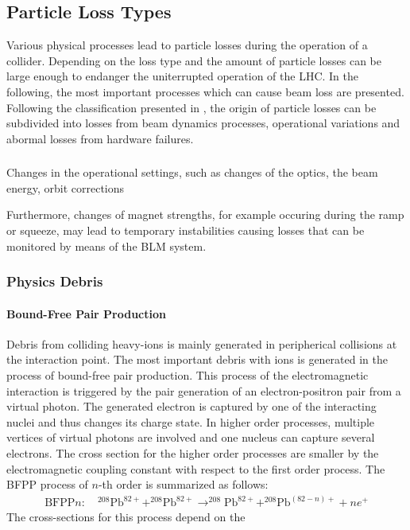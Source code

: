 \subsection{Particle Loss Types}\label{chap:physics_lossmaps}
%
%
Various physical processes lead to particle losses during the operation of a collider. Depending on the loss type and the amount of particle losses can be large enough to endanger the uniterrupted operation of the LHC. In the following, the most important processes which can cause beam loss are presented. Following the classification presented in \cite{CERN-2004-003-V1}, the origin of particle losses can be subdivided into losses from beam dynamics processes, operational variations and abormal losses from hardware failures. 
%
\subsubsection{} 

Changes in the operational settings, such as changes of the optics, the beam energy, orbit corrections 

Furthermore, changes of magnet strengths, for example occuring during the ramp or squeeze, may lead to temporary instabilities causing losses that can be monitored by means of the BLM system. 
%
\subsubsection{Physics Debris} 

\paragraph{Bound-Free Pair Production}
Debris from colliding heavy-ions is mainly generated in peripherical collisions at the interaction point. The most important debris with \lead ions is generated in the process of bound-free pair production. This process of the electromagnetic interaction is triggered by the pair generation of an electron-positron pair from a virtual photon. The generated electron is captured by one of the interacting nuclei and thus changes its charge state. In higher order processes, multiple vertices of virtual photons are involved and one nucleus can capture several electrons. The cross section for the higher order processes are smaller by the electromagnetic coupling constant with respect to the first order process. The BFPP process of $n$-th order is summarized as follows:
%
\begin{align}
  \text{BFPP}n:  \quad ^{208}\text{Pb}^{82+} + ^{208}\text{Pb}^{82+} \rightarrow ^{208}\text{Pb}^{82+} + ^{208}\text{Pb}^{(82-n)+} + n e^+
\end{align}
%
The cross-sections for this process depend on the 



